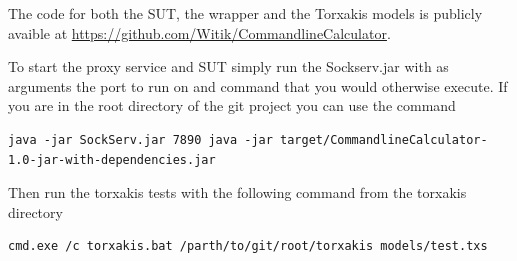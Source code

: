 \documentclass[11pt,a4paper]{article}
\begin{document}
The code for both the SUT, the wrapper and the Torxakis models is
publicly avaible at
\url{https://github.com/Witik/CommandlineCalculator}.

To start the proxy service and SUT simply run the Sockserv.jar with as
arguments the port to run on and command that you would otherwise
execute. If you are in the root directory of the git project you can use the command

\begin{verbatim}
java -jar SockServ.jar 7890 java -jar target/CommandlineCalculator-1.0-jar-with-dependencies.jar
\end{verbatim}

Then run the torxakis tests with the following command from the torxakis directory

\begin{verbatim}
cmd.exe /c torxakis.bat /parth/to/git/root/torxakis models/test.txs
\end{verbatim}
\end{document}
